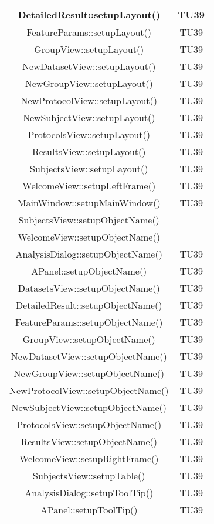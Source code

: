 \begin{center}
\begin{longtable}{|c|c|}
\hline 
DetailedResult::setupLayout() & TU39 \\
\hline 
FeatureParams::setupLayout() & TU39 \\
\hline 
GroupView::setupLayout() & TU39 \\
\hline 
NewDatasetView::setupLayout() & TU39 \\
\hline 
NewGroupView::setupLayout() & TU39 \\
\hline 
NewProtocolView::setupLayout() & TU39 \\
\hline 
NewSubjectView::setupLayout() & TU39 \\
\hline 
ProtocolsView::setupLayout() & TU39 \\
\hline 
ResultsView::setupLayout() & TU39 \\
\hline 
SubjectsView::setupLayout() & TU39 \\
\hline 
WelcomeView::setupLeftFrame() & TU39 \\
\hline 
MainWindow::setupMainWindow() & TU39 \\
\hline 
SubjectsView::setupObjectName() &  \\
\hline 
WelcomeView::setupObjectName() &  \\
\hline 
AnalysisDialog::setupObjectName() & TU39 \\
\hline 
APanel::setupObjectName() & TU39 \\
\hline 
DatasetsView::setupObjectName() & TU39 \\
\hline 
DetailedResult::setupObjectName() & TU39 \\
\hline 
FeatureParams::setupObjectName() & TU39 \\
\hline 
GroupView::setupObjectName() & TU39 \\
\hline 
NewDatasetView::setupObjectName() & TU39 \\
\hline 
NewGroupView::setupObjectName() & TU39 \\
\hline 
NewProtocolView::setupObjectName() & TU39 \\
\hline 
NewSubjectView::setupObjectName() & TU39 \\
\hline 
ProtocolsView::setupObjectName() & TU39 \\
\hline 
ResultsView::setupObjectName() & TU39 \\
\hline 
WelcomeView::setupRightFrame() & TU39 \\
\hline 
SubjectsView::setupTable() & TU39 \\
\hline 
AnalysisDialog::setupToolTip() & TU39 \\
\hline 
APanel::setupToolTip() & TU39 \\

\end{longtable}
\end{center}
